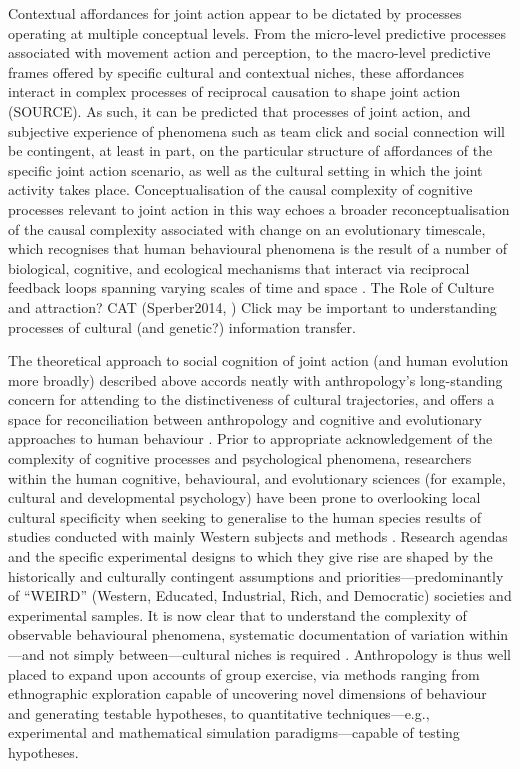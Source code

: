 \begin{CJK}{UTF8}{gbsn}
Contextual affordances for joint action appear to be dictated by processes operating at multiple conceptual levels.  From the micro-level predictive processes associated with movement action and perception, to the macro-level predictive frames offered by specific cultural and contextual niches, these affordances interact in complex processes of reciprocal causation to shape joint action (SOURCE).  As such, it can be predicted that processes of joint action, and subjective experience of phenomena such as team click and social connection will be contingent, at least in part, on the particular structure of affordances of the specific joint action scenario, as well as the cultural setting in which the joint activity takes place.  Conceptualisation of the causal complexity of cognitive processes relevant to joint action in this way echoes a broader reconceptualisation of the causal complexity associated with change on an evolutionary timescale, which recognises that human behavioural phenomena is the result of a number of biological, cognitive, and ecological mechanisms that interact via reciprocal feedback loops spanning varying scales of time and space \citep{Fuentes2015}.
The Role of Culture and attraction? CAT (Sperber2014, )
Click may be important to understanding processes of cultural (and genetic?) information transfer.

The theoretical approach to social cognition of joint action (and human evolution more broadly) described above accords neatly with anthropology's long-standing concern for attending to the distinctiveness of cultural trajectories, and offers a space for reconciliation between anthropology and cognitive and evolutionary approaches to human behaviour \citep{Whitehouse2012}.  Prior to appropriate acknowledgement of the complexity of cognitive processes and psychological phenomena, researchers within the human cognitive, behavioural, and evolutionary sciences (for example, cultural and developmental psychology) have been prone to overlooking local cultural specificity when seeking to generalise to the human species results of studies conducted with mainly Western subjects and methods \citep{Henrich2010d}.  Research agendas and the specific experimental designs to which they give rise are shaped by the historically and culturally contingent assumptions and priorities---predominantly of ``WEIRD'' (Western, Educated, Industrial, Rich, and Democratic) societies and experimental samples.  It is now clear that to understand the complexity of observable behavioural phenomena, systematic documentation of variation within---and not simply between---cultural niches is required \citep{Fuentes2016}.  Anthropology is thus well placed to expand upon accounts of group exercise, via methods ranging from ethnographic exploration capable of uncovering novel dimensions of behaviour and generating testable hypotheses, to quantitative techniques---e.g., experimental and mathematical simulation paradigms---capable of testing hypotheses.


\end{CJK}
